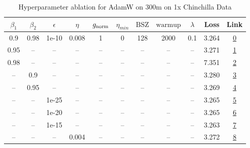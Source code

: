 \begin{table}[H]
\centering
\caption{Hyperparameter ablation for AdamW on 300m on 1x Chinchilla Data}
\label{tab:ablation_adamw_300m_on_1x_chinchilla_data}
\begin{tabular}{ccccccccccc}
\toprule
$\beta_1$ & $\beta_2$ & $\epsilon$ & $\eta$ & $g_{\mathrm{norm}}$ & $\eta_{min}$ & $\mathrm{BSZ}$ & $\mathrm{warmup}$ & $\lambda$ & Loss & Link \\
\midrule
0.9 & 0.98 & 1e-10 & 0.008 & 1 & 0 & 128 & 2000 & 0.1 & 3.264 & \href{https://wandb.ai/marin-community/optimizer-scaling/runs/sweep-300m-6B-adamwa7aafelr0.008-wd0.1-minlr0-warmup2000-b10.9-b-990eda}{0} \\
\midrule
0.95 & -- & -- & -- & -- & -- & -- & -- & -- & 3.271 & \href{https://wandb.ai/marin-community/optimizer-scaling/runs/sweep-300m-6B-adamw55fc1flr0.008-wd0.1-minlr0-warmup2000-b10.95--b7196b}{1} \\
0.98 & -- & -- & -- & -- & -- & -- & -- & -- & 7.351 & \href{https://wandb.ai/marin-community/optimizer-scaling/runs/sweep-300m-6B-adamw3aa56elr0.008-wd0.1-minlr0-warmup2000-b10.98--36a5e7}{2} \\
-- & 0.9 & -- & -- & -- & -- & -- & -- & -- & 3.280 & \href{https://wandb.ai/marin-community/optimizer-scaling/runs/sweep-300m-6B-adamw72a6d2lr0.008-wd0.1-minlr0-warmup2000-b10.9-b-dde1e5}{3} \\
-- & 0.95 & -- & -- & -- & -- & -- & -- & -- & 3.269 & \href{https://wandb.ai/marin-community/optimizer-scaling/runs/sweep-300m-6B-adamw901abclr0.008-wd0.1-minlr0-warmup2000-b10.9-b-de77a3}{4} \\
-- & -- & 1e-25 & -- & -- & -- & -- & -- & -- & 3.265 & \href{https://wandb.ai/marin-community/optimizer-scaling/runs/sweep-300m-6B-adamwfa0d44lr0.008-wd0.1-minlr0-warmup2000-b10.9-b-89eba9}{5} \\
-- & -- & 1e-20 & -- & -- & -- & -- & -- & -- & 3.265 & \href{https://wandb.ai/marin-community/optimizer-scaling/runs/sweep-300m-6B-adamw057b30lr0.008-wd0.1-minlr0-warmup2000-b10.9-b-cff503}{6} \\
-- & -- & 1e-15 & -- & -- & -- & -- & -- & -- & 3.263 & \href{https://wandb.ai/marin-community/optimizer-scaling/runs/sweep-300m-6B-adamw863e5alr0.008-wd0.1-minlr0-warmup2000-b10.9-b-8395a7}{7} \\
-- & -- & -- & 0.004 & -- & -- & -- & -- & -- & 3.272 & \href{https://wandb.ai/marin-community/optimizer-scaling/runs/sweep-300m-6B-adamw0c32aelr0.004-wd0.1-minlr0-warmup2000-b10.9-b-a044c7}{8} \\

\end{tabular}
\end{table}
